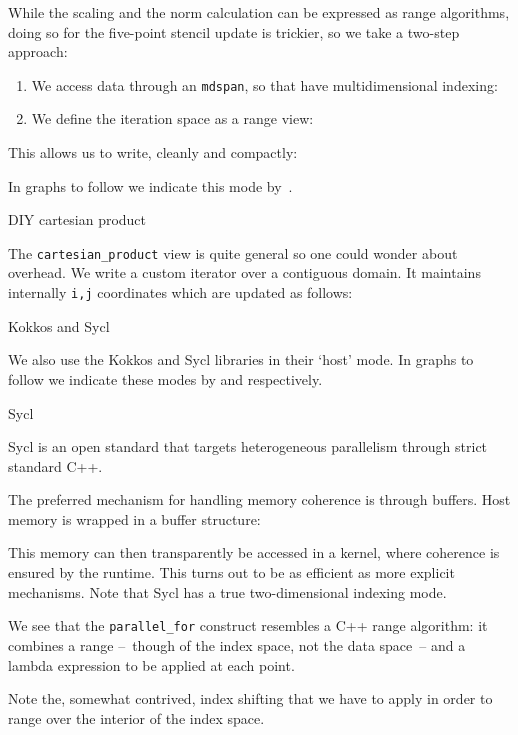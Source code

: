While the scaling and the norm calculation can be expressed as range algorithms,
doing so for the five-point stencil update is trickier,
so we take a two-step approach:
\begin{enumerate}
\item We access data through an \lstinline{mdspan}, so that have multidimensional indexing:


\item We define the iteration space as a  range view:


\end{enumerate}
This allows us to write, cleanly and compactly:

In graphs to follow we indicate this mode by~.

 {DIY cartesian product}

The \lstinline{cartesian_product} view is quite general
so one could wonder about overhead.
We write a custom iterator over a contiguous domain.
It maintains internally \lstinline{i,j} coordinates
which are updated as follows:
%

 {Kokkos and Sycl}

We also use the Kokkos and Sycl libraries in their `host' mode.
In graphs to follow we indicate these modes
by  and  respectively.

 {Sycl}

Sycl is an open standard that targets
heterogeneous parallelism through strict standard C++.

The preferred mechanism for handling memory coherence is through buffers.
Host memory is wrapped in a buffer structure:

This memory can then transparently be accessed in a kernel, where
coherence is ensured by the runtime.
This turns out to be as efficient as more explicit mechanisms.
%
%
Note that Sycl has a true two-dimensional indexing mode.

We see that the \lstinline{parallel_for} construct
resembles a C++ range algorithm: it combines
a range --~though of the index space, not the data space~--
and a lambda expression to be applied at each point.

Note the, somewhat contrived, index shifting that we have to apply
in order to range over the interior of the index space.

